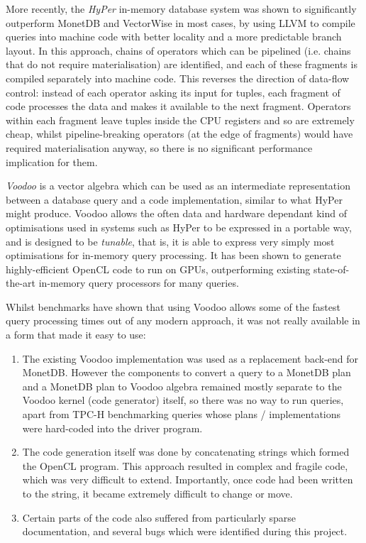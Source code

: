 More recently, the \emph{HyPer} in-memory database system \cite{Neumann:2011:ECE:2002938.2002940} was shown to significantly outperform MonetDB and VectorWise in most cases, by using LLVM to compile queries into machine code with better locality and a more predictable branch layout. In this approach, chains of operators which can be pipelined (i.e. chains that do not require materialisation) are identified, and each of these fragments is compiled separately into machine code. This reverses the direction of data-flow control: instead of each operator asking its input for tuples, each fragment of code processes the data and makes it available to the next fragment. Operators within each fragment leave tuples inside the CPU registers and so are extremely cheap, whilst pipeline-breaking operators (at the edge of fragments) would have required materialisation anyway, so there is no significant performance implication for them.

\emph{Voodoo} \cite{Pirk:2016:VVA:3007328.3007336} is a vector algebra which can be used as an intermediate representation between a database query and a code implementation, similar to what HyPer might produce. Voodoo allows the often data and hardware dependant kind of optimisations used in systems such as HyPer to be expressed in a portable way, and is designed to be \emph{tunable}, that is, it is able to express very simply most optimisations for in-memory query processing. It has been shown to generate highly-efficient OpenCL code to run on GPUs, outperforming existing state-of-the-art in-memory query processors for many queries.

Whilst benchmarks have shown that using Voodoo allows some of the fastest query processing times out of any modern approach, it was not really available in a form that made it easy to use:

\begin{enumerate}
    \item The existing Voodoo implementation was used as a replacement back-end for MonetDB. However the components to convert a query to a MonetDB plan and a MonetDB plan to Voodoo algebra remained mostly separate to the Voodoo kernel (code generator) itself, so there was no way to run queries, apart from TPC-H benchmarking queries whose plans / implementations were hard-coded into the driver program.
    \item The code generation itself was done by concatenating strings which formed the OpenCL program. This approach resulted in complex and fragile code, which was very difficult to extend. Importantly, once code had been written to the string, it became extremely difficult to change or move.
    \item Certain parts of the code also suffered from particularly sparse documentation, and several bugs which were identified during this project.
\end{enumerate}

